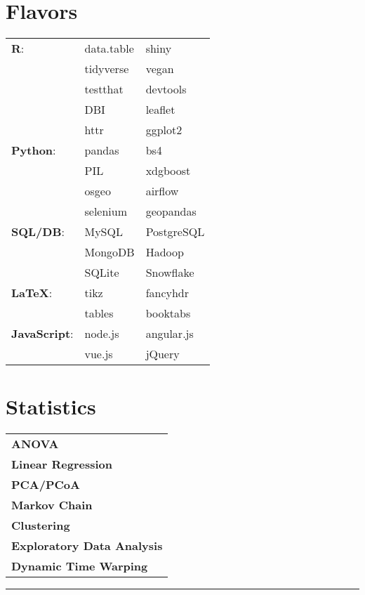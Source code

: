 \documentclass[10pt]{article}%
\begin{document}
\begin{minipage}[t]{.5\linewidth}%
\flushleft
\section*{\faCubes{} Flavors}%
   {\small
      \begin{tabularx}{\linewidth}{p{.2\linewidth}XX}
         \textbf{R}: & data.table & shiny \\
                     & tidyverse  & vegan \\
                     & testthat   & devtools \\
                     & DBI        & leaflet \\
                     & httr       & ggplot2 \\
         \hline
         \textbf{Python}: & pandas & bs4 \\
                          & PIL    & xdgboost \\
                          & osgeo  & airflow \\
                          & selenium & geopandas \\
         \hline
         \textbf{SQL/DB}: & MySQL & PostgreSQL \\
                       & MongoDB & Hadoop \\
                       & SQLite  & Snowflake \\
         \hline
         \textbf{\LaTeX }:  & tikz   & fancyhdr \\
                           & tables & booktabs \\
         \hline
         \textbf{JavaScript}: & node.js & angular.js \\
                              & vue.js & jQuery
     \end{tabularx}}
     \flushleft%
\end{minipage}
\begin{minipage}[t]{.2\linewidth}%
   \section*{\faBarChart{} Statistics}%
   \flushright
   {\small
      \begin{tabularx}{\linewidth}{X}
        \textbf{ANOVA} \\
        \textbf{Linear Regression} \\
        \textbf{PCA/PCoA} \\
        \textbf{Markov Chain} \\
        \textbf{Clustering} \\
        \textbf{Exploratory Data Analysis} \\
        \textbf{Dynamic Time Warping} \\
      \end{tabularx}}
      \flushleft%
\end{minipage}
\par\noindent\rule{\textwidth}{0.4pt}
\end{document}
